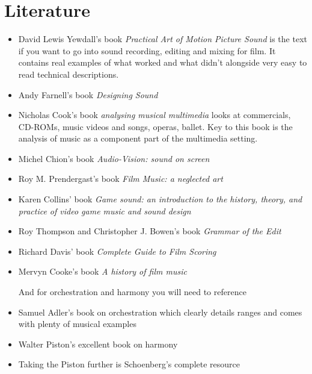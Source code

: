 
\chapter{Literature}
\label{literatures}

\begin{itemize}
\item David Lewis Yewdall's book \textit{Practical Art of Motion Picture Sound} \citep{yewdall2003practical} 
is the text if you want to go into sound recording, editing and mixing for film. It contains real examples of what worked and what didn't alongside very easy to read technical descriptions. 


\item Andy Farnell's book \textit{Designing Sound} \citep{farnell2010designing}

 
\item Nicholas Cook's book \textit{analysing musical multimedia} \citep{cook1998analysing} looks at commercials, CD-ROMs, music videos and songs, operas, ballet. Key to this book is the analysis of music as a component part of the multimedia setting. 


\item Michel Chion's book \textit{Audio-Vision: sound on screen} \citep{chion1990} 


\item Roy M. Prendergast's book \textit{Film Music: a neglected art} \citep{prendergast1992film} 

\item Karen Collins' book \textit{Game sound: an introduction to the history, theory, and practice of video game music and sound design} \citep{collins2008game}


\item Roy Thompson and Christopher J. Bowen's book \textit{Grammar of the Edit} \citep{thompson2009grammar} 

\item Richard Davis' book \textit{Complete Guide to Film Scoring} \citep{davis2010complete}

\item Mervyn Cooke's book \textit{A history of film music} \citep{cooke2008history}

And for orchestration and harmony you will need to reference

\item Samuel Adler's book on orchestration which clearly details ranges and comes with plenty of musical examples \citep{adler1989study} 
\item Walter Piston's excellent book on harmony \citep{piston1978harmony}
\item Taking the Piston further is Schoenberg's complete resource \citep{schoenberg1978theory}
\end{itemize}
